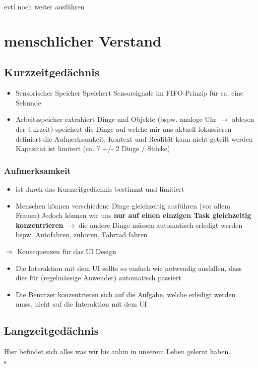 \documentclass{report}
\theoremstyle{definition}
\theoremstyle{example}
\begin{document}
evtl noch weiter ausführen

\section{menschlicher Verstand}

\subsection{Kurzzeitgedächnis}
\begin{itemize}
   \item Sensorischer Speicher
   \subitem Speichert Sensorsignale im FIFO-Prinzip für ca. eine Sekunde
   \item Arbeitsspeicher
   \subitem extrahiert Dinge und Objekte (bspw. analoge Uhr $\rightarrow$ ablesen der Uhrzeit)
   \subitem speichert die Dinge auf welche mir uns aktuell fokussieren
   \subitem definiert die Aufmerksamkeit, Kontext und Realität
   \subitem kann nicht geteilt werden
   \subitem Kapazität ist limitert (ca. 7 +/- 2 Dinge / Stücke)
\end{itemize}

\subsubsection{Aufmerksamkeit}
\begin{itemize}
   \item ist durch das Kurzzeitgedächnis bestimmt und limitiert
   \item Menschen können verschiedene Dinge gleichzeitig ausführen (vor allem Frauen)
   \subitem Jedoch können wir uns \textbf{nur auf einen einzigen Task gleichzeitig konzentrieren} $\rightarrow$ die andere Dinge müssen automatisch erledigt werden bspw. Autofahren, zuhören, Fahrrad fahren 
\end{itemize}
$\Rightarrow$ Konsequenzen für das UI Design
\begin{itemize}
   \item Die Interaktion mit dem UI sollte so einfach wie notwendig ausfallen, dass dies für (regelmässige Anwender) automatisch passiert
   \item Die Benutzer konzentrieren sich auf die Aufgabe, welche erledigt werden muss, nicht auf die Interaktion mit dem UI
\end{itemize}

\subsection{Langzeitgedächnis}
Hier befindet sich alles was wir bis anhin in unserem Leben gelernt haben.\\s
\end{document}
